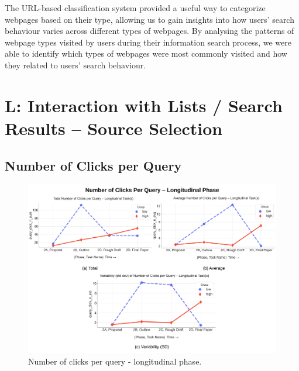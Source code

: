 \documentclass[letterpaper, nobind]{templates/ociamthesis}
\begin{document}
The URL-based classification system provided a useful way to categorize webpages based on their type, allowing us to gain insights into how users' search behaviour varies across different types of webpages. By analysing the patterns of webpage types visited by users during their information search process, we were able to identify which types of webpages were most commonly visited and how they related to users' search behaviour.

\hypertarget{l-interaction-with-lists-search-results-source-selection}{%
\section{L: Interaction with Lists / Search Results -- Source Selection}\label{l-interaction-with-lists-search-results-source-selection}}

\hypertarget{number-of-clicks-per-query}{%
\subsection{Number of Clicks per Query}\label{number-of-clicks-per-query}}

\begin{figure}

{\centering \includegraphics[width=1\linewidth]{figs/rp2-query-click} 

}

\caption[Number of clicks per query - longitudinal phase.]{Number of clicks per query - longitudinal phase.}\label{fig:rp2-query-click}
\end{figure}
\end{document}
